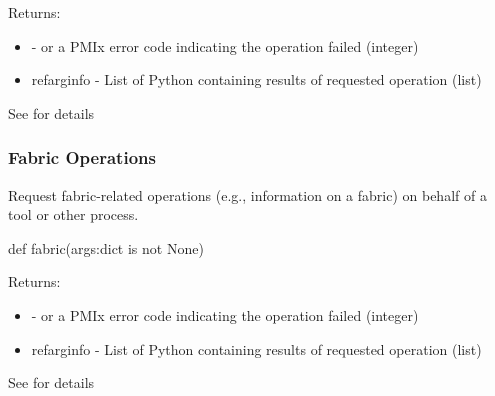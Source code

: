 Returns:
\begin{itemize}
    \item {} -  or a \ac{PMIx} error code indicating the operation failed (integer)
    \item refarg{info} - List of Python  containing results of requested operation (list)
\end{itemize}

See  for details


\subsubsection{Fabric Operations}

\summary

Request fabric-related operations (e.g., information on a fabric) on behalf of a tool or other process.

\format

\pyspecificstart
\begin{codepar}
def fabric(args:dict is not None)
\end{codepar}
\pyspecificend

\begin{arglist}
\end{arglist}

Returns:
\begin{itemize}
    \item {} -  or a \ac{PMIx} error code indicating the operation failed (integer)
    \item refarg{info} - List of Python  containing results of requested operation (list)
\end{itemize}

See  for details



